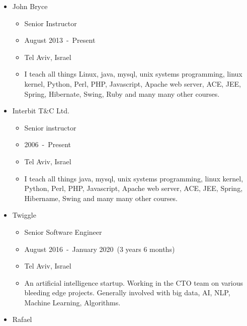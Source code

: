 \documentclass[
]{article}
\providecommand{\tightlist}{%
  \setlength{\itemsep}{0pt}\setlength{\parskip}{0pt}}
\begin{document}
\begin{itemize}
  \begin{itemize}
  \tightlist
  \item
    Senior Technical Consultant
  \item
    October 2019~-~Present
  \item
    Tel Aviv, Israel
  \item
    I consult various companies regarding correct technology use and
    architecture regarding many subjects and in particular efficient use
    of public cloud resources such as AWS.
  \end{itemize}
\item
  John Bryce

  \begin{itemize}
  \tightlist
  \item
    Senior Instructor
  \item
    August 2013~-~Present
  \item
    Tel Aviv, Israel
  \item
    I teach all things Linux, java, mysql, unix systems programming,
    linux kernel, Python, Perl, PHP, Javascript, Apache web server, ACE,
    JEE, Spring, Hibernate, Swing, Ruby and many many other courses.
  \end{itemize}
\item
  Interbit T\&C Ltd.

  \begin{itemize}
  \tightlist
  \item
    Senior instructor
  \item
    2006~-~Present
  \item
    Tel Aviv, Israel
  \item
    I teach all things java, mysql, unix systems programming, linux
    kernel, Python, Perl, PHP, Javascript, Apache web server, ACE, JEE,
    Spring, Hibername, Swing and many many other courses.
  \end{itemize}
\item
  Twiggle

  \begin{itemize}
  \tightlist
  \item
    Senior Software Engineer
  \item
    August 2016~-~January 2020~(3 years 6 months)
  \item
    Tel Aviv, Israel
  \item
    An artificial intelligence startup. Working in the CTO team on
    various bleeding edge projects. Generally involved with big data,
    AI, NLP, Machine Learning, Algorithms.
  \end{itemize}
\item
  Rafael


\end{itemize}
\end{document}
